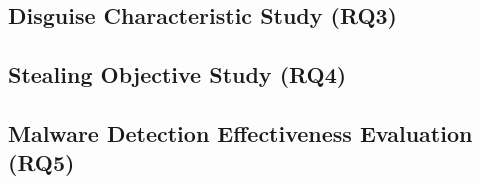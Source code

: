 \subsection{Disguise Characteristic Study (RQ3)}


\subsection{Stealing Objective Study (RQ4)}


\subsection{Malware Detection Effectiveness Evaluation (RQ5)}



